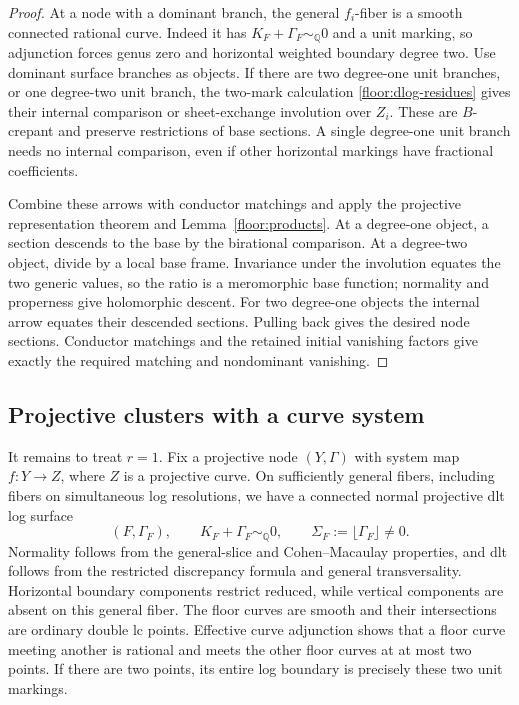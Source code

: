 \documentclass[11pt,letterpaper]{article}
\newcommand{\Q}{\mathbb{Q}}
\theoremstyle{definition}
\theoremstyle{remark}
\begin{document}
\begin{proof}
At a node with a dominant branch, the general
$f_i$-fiber is a smooth connected rational curve.
Indeed it has
$K_F+\Gamma_F\sim_\Q0$ and a unit marking, so
adjunction forces genus zero and horizontal weighted
boundary degree two.  Use dominant surface branches
as objects.  If there are two degree-one unit
branches, or one degree-two unit branch, the
two-mark calculation
\eqref{floor:dlog-residues} gives their internal
comparison or sheet-exchange involution over $Z_i$.
These are $B$-crepant and preserve restrictions of
base sections.  A single degree-one unit branch
needs no internal comparison, even if other
horizontal markings have fractional coefficients.

Combine these arrows with conductor matchings and
apply the projective representation theorem and
Lemma~\ref{floor:products}.  At a degree-one object,
a section descends to the base by the birational
comparison.  At a degree-two object, divide by a
local base frame.  Invariance under the involution
equates the two generic values, so the ratio is a
meromorphic base function; normality and properness
give holomorphic descent.  For two degree-one
objects the internal arrow equates their descended
sections.  Pulling back gives the desired node
sections.  Conductor matchings and the retained
initial vanishing factors give exactly the required
matching and nondominant vanishing.
\end{proof}

\subsection{Projective clusters with a curve system}

It remains to treat $r=1$.  Fix a projective node
$(Y,\Gamma)$ with system map $f:Y\to Z$, where $Z$
is a projective curve.  On sufficiently general fibers,
including fibers on simultaneous log resolutions, we
have a connected normal projective dlt log surface
\begin{equation}
 \label{floor:surface-fiber}
 (F,\Gamma_F),\qquad
 K_F+\Gamma_F\sim_\Q0,\qquad
 \Sigma_F:=\lfloor\Gamma_F\rfloor\ne0.
\end{equation}
Normality follows from the general-slice and
Cohen--Macaulay properties, and dlt follows from the
restricted discrepancy formula and general
transversality.  Horizontal boundary components
restrict reduced, while vertical components are
absent on this general fiber.  The floor curves are
smooth and their intersections are ordinary double
lc points.  Effective curve adjunction shows that a
floor curve meeting another is rational and meets
the other floor curves at at most two points.  If
there are two points, its entire log boundary is
precisely these two unit markings.
\end{document}
